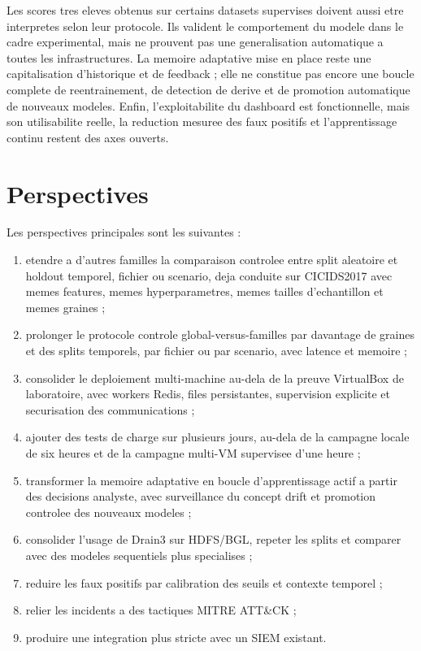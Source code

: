 Les scores tres eleves obtenus sur certains datasets supervises doivent aussi etre interpretes selon leur protocole. Ils valident le comportement du modele dans le cadre experimental, mais ne prouvent pas une generalisation automatique a toutes les infrastructures. La memoire adaptative mise en place reste une capitalisation d'historique et de feedback ; elle ne constitue pas encore une boucle complete de reentrainement, de detection de derive et de promotion automatique de nouveaux modeles. Enfin, l'exploitabilite du dashboard est fonctionnelle, mais son utilisabilite reelle, la reduction mesuree des faux positifs et l'apprentissage continu restent des axes ouverts.

\section{Perspectives}
Les perspectives principales sont les suivantes :
\begin{enumerate}
  \item etendre a d'autres familles la comparaison controlee entre split aleatoire et holdout temporel, fichier ou scenario, deja conduite sur CICIDS2017 avec memes features, memes hyperparametres, memes tailles d'echantillon et memes graines ;
  \item prolonger le protocole controle global-versus-familles par davantage de graines et des splits temporels, par fichier ou par scenario, avec latence et memoire ;
  \item consolider le deploiement multi-machine au-dela de la preuve VirtualBox de laboratoire, avec workers Redis, files persistantes, supervision explicite et securisation des communications ;
  \item ajouter des tests de charge sur plusieurs jours, au-dela de la campagne locale de six heures et de la campagne multi-VM supervisee d'une heure ;
  \item transformer la memoire adaptative en boucle d'apprentissage actif a partir des decisions analyste, avec surveillance du concept drift et promotion controlee des nouveaux modeles ;
  \item consolider l'usage de Drain3 sur HDFS/BGL, repeter les splits et comparer avec des modeles sequentiels plus specialises ;
  \item reduire les faux positifs par calibration des seuils et contexte temporel ;
  \item relier les incidents a des tactiques MITRE ATT\&CK ;
  \item produire une integration plus stricte avec un SIEM existant.
\end{enumerate}

